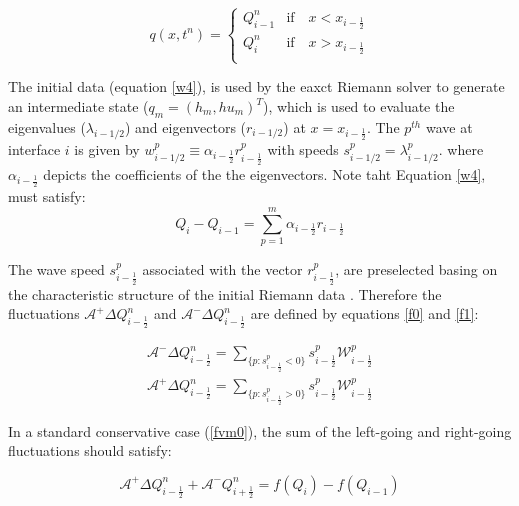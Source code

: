 \documentclass[12pt,a4paper]{article}
\begin{document}
	\begin{equation}
		q(x,t^n)  = \begin{cases}
			Q_{i-1}^{n}  & \text{if} \quad  x < x_{i-\frac{1}{2}}\\
				Q_{i}^{n} & \text{if} \quad x > x_{i-\frac{1}{2}}\\
		\end{cases}    
		\label{w4}   
	\end{equation}

 \noindent The initial data (equation \eqref{w4}), is used by the eaxct Riemann solver to generate an intermediate state ($q_m = (h_m, hu_m)^T$), which is used to evaluate the eigenvalues ($\lambda_{i-1/2}$) and eigenvectors ($r_{i-1/2}$) at $x = x_{i-\frac{1}{2}}$. The $p^{th}$ wave at interface $i$ is given by $w^p_{i-1/2} \equiv \alpha_{i-\frac{1}{2}} r^p_{i-\frac{1}{2}}$ with speeds $s^p_{i-1/2} = \lambda^p_{i-1/2}$. where $ \alpha_{i-\frac{1}{2}}$ depicts the coefficients of the the eigenvectors.  Note taht Equation \eqref{w4}, must satisfy:
	\begin{equation}
		Q_{i} -  Q_{i-1} = \sum_{p=1}^{m}  \alpha_{i-\frac{1}{2}} r_{i-\frac{1}{2}}
		\label{wpa19}
	\end{equation}
	
	\noindent The wave speed $s_{i-\frac{1}{2}}^{p}$ associated with the vector $r_{i-\frac{1}{2}}^{p}$, are preselected basing on the characteristic structure of the initial Riemann data \cite{ge:2008}. Therefore the fluctuations $\mathcal{A^{+}}\Delta Q_{i-\frac{1}{2}}^{n}$  and $\mathcal{A^{-}}\Delta Q_{i-\frac{1}{2}}^{n} $ are defined by equations \eqref{f0} and \eqref{f1}:
	
	\begin{eqnarray}
		\mathcal{A^{-}}\Delta Q_{i-\frac{1}{2}}^{n} = \sum_{\{ p:s_{i-\frac{1}{2}}^{p}<0\}} s_{i-\frac{1}{2}}^{p} \mathcal{W}_{i-\frac{1}{2}}^{p}
		\label{f0}\\
		\mathcal{A^{+}}\Delta Q_{i-\frac{1}{2}}^{n} =\sum_{\{ p:s_{i-\frac{1}{2}}^{p}>0\}} s_{i-\frac{1}{2}}^{p} \mathcal{W}_{i-\frac{1}{2}}^{p}
		\label{f1}
	\end{eqnarray}
	
	\noindent In a standard  conservative case (\eqref{fvm0}), the sum of the left-going and right-going fluctuations should satisfy:
	
	\begin{equation}
		\mathcal{A^{+}}\Delta 	Q_{i-\frac{1}{2}}^{n} + \mathcal{A^{-}}Q_{i+\frac{1}{2}}^{n} = f(Q_{i}) - f(Q_{i-1})
	\end{equation}
	
\end{document}

